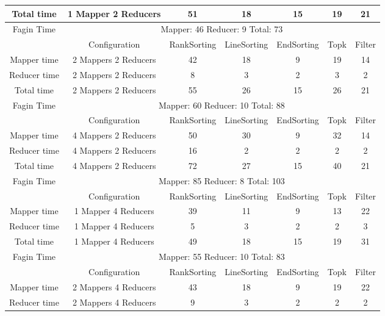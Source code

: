 \documentclass[a4paper]{article}
\begin{document}
\begin{table}[htbp]
\begin{center}
\begin{tabular}{|c|c|c|c|c|c|c|}
            Total time & 1 Mapper 2 Reducers & 51 & 18 & 15 & 19 & 21 \\
            \hline
            Fagin Time & \multicolumn{6}{|c|}{Mapper: 46 Reducer: 9 Total: 73}  \\
            \hline
            \hline
             & Configuration & RankSorting & LineSorting & EndSorting & Topk & Filter  \\
            \hline
            Mapper time & 2 Mappers 2 Reducers & 42 & 18 & 9 & 19 & 14  \\
            Reducer time & 2 Mappers 2 Reducers & 8 & 3 & 2 & 3 & 2   \\
            Total time & 2 Mappers 2 Reducers & 55 & 26 & 15 & 26 & 21 \\
            \hline
            Fagin Time & \multicolumn{6}{|c|}{Mapper: 60 Reducer: 10 Total: 88}  \\
            \hline
            \hline
             & Configuration & RankSorting & LineSorting & EndSorting & Topk & Filter  \\
            \hline
            Mapper time & 4 Mappers 2 Reducers & 50 & 30 & 9 & 32 & 14  \\
            Reducer time & 4 Mappers 2 Reducers & 16 & 2 & 2 & 2 & 2   \\
            Total time & 4 Mappers 2 Reducers & 72 & 27 & 15 & 40 & 21 \\
            \hline
            Fagin Time & \multicolumn{6}{|c|}{Mapper: 85 Reducer: 8 Total: 103}  \\
            \hline
            \hline
             & Configuration & RankSorting & LineSorting & EndSorting & Topk & Filter  \\
            \hline
            Mapper time & 1 Mapper 4 Reducers & 39 & 11 & 9 & 13 & 22  \\
            Reducer time & 1 Mapper 4 Reducers & 5 & 3 & 2 & 2 & 3  \\
            Total time & 1 Mapper 4 Reducers & 49 & 18 & 15 & 19 & 31 \\
            \hline
            Fagin Time & \multicolumn{6}{|c|}{Mapper: 55 Reducer: 10 Total: 83}  \\
            \hline
            \hline
             & Configuration & RankSorting & LineSorting & EndSorting & Topk & Filter  \\
            \hline
            Mapper time & 2 Mappers 4 Reducers & 43 & 18 & 9 & 19 & 22  \\
            Reducer time & 2 Mappers 4 Reducers & 9 & 3 & 2 & 2 & 2   \\

\end{tabular}
\end{center}
\end{table}
\end{document}
